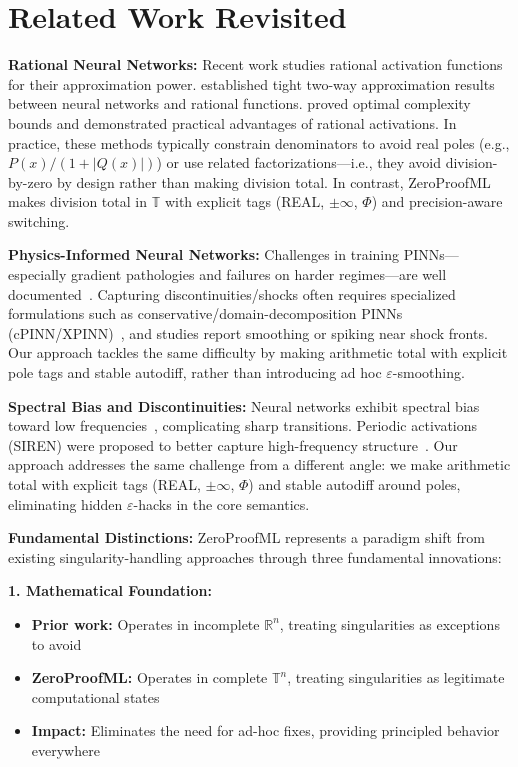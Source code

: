 \documentclass[twoside,11pt]{article}
\newcommand{\TR}{\mathbb{T}}
\newcommand{\trReal}{\textsc{REAL}}
\newcommand{\TAGREAL}{\trReal}
\begin{document}
\section{Related Work Revisited}

\textbf{Rational Neural Networks:}
Recent work studies rational activation functions for their approximation power. \citet{telgarsky2017neural} established tight two-way approximation results between neural networks and rational functions. \citet{boulle2020rational} proved optimal complexity bounds and demonstrated practical advantages of rational activations. In practice, these methods typically constrain denominators to avoid real poles (e.g., $P(x)/(1+|Q(x)|)$) or use related factorizations—i.e., they avoid division-by-zero by design rather than making division total. In contrast, ZeroProofML makes division total in $\TR$ with explicit tags (\TAGREAL, $\pm\infty$, $\Phi$) and precision-aware switching.

\textbf{Physics-Informed Neural Networks:}
Challenges in training PINNs—especially gradient pathologies and failures on harder regimes—are well documented~\citep{wang2021understanding,krishnapriyan2021characterizing}. Capturing discontinuities/shocks often requires specialized formulations such as conservative/domain-decomposition PINNs (cPINN/XPINN)~\citep{jagtap2020conservative}, and studies report smoothing or spiking near shock fronts. Our approach tackles the same difficulty by making arithmetic total with explicit pole tags and stable autodiff, rather than introducing ad hoc $\varepsilon$-smoothing.

\textbf{Spectral Bias and Discontinuities:}
Neural networks exhibit spectral bias toward low frequencies~\citep{rahaman2019spectral}, complicating sharp transitions. Periodic activations (SIREN) were proposed to better capture high-frequency structure~\citep{sitzmann2020implicit}. Our approach addresses the same challenge from a different angle: we make arithmetic total with explicit tags (\TAGREAL, $\pm\infty$, $\Phi$) and stable autodiff around poles, eliminating hidden $\varepsilon$-hacks in the core semantics.

\textbf{Fundamental Distinctions:}
ZeroProofML represents a paradigm shift from existing singularity-handling approaches through three fundamental innovations:

\textbf{1. Mathematical Foundation:}
\begin{itemize}
\item \textbf{Prior work:} Operates in incomplete $\mathbb{R}^n$, treating singularities as exceptions to avoid
\item \textbf{ZeroProofML:} Operates in complete $\TR^n$, treating singularities as legitimate computational states
\item \textbf{Impact:} Eliminates the need for ad-hoc fixes, providing principled behavior everywhere
\end{itemize}
\end{document}
